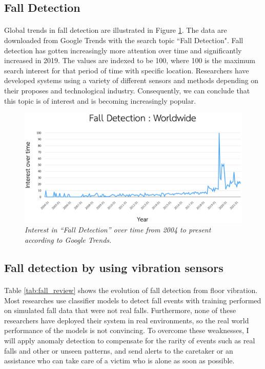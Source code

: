 \subsection{Fall Detection}
\paragraph{}
Global trends in fall detection are illustrated in Figure \ref{fig:fall_trend}. The data are downloaded from Google Trends with the search topic ``Fall Detection". Fall detection has gotten increasingly more attention over time and significantly increased in 2019. The values are indexed to be 100, where 100 is the maximum search interest for that period of time with specific location. Researchers have developed systems using a variety of different sensors and methods depending on their proposes and technological industry. Consequently, we can conclude that this topic is of interest and is becoming increasingly popular.


\begin{figure}[H]
  \centering
  \caption[Fall detection trends]{\emph{Interest in “Fall Detection” over time from 2004 to present according to Google Trends.}}\label{fig:fall_trend}
  \includegraphics[width=\textwidth]{figures/fall_trend.png}  
\end{figure}

\subsection{Fall detection by using vibration sensors}
\paragraph{}
Table \ref{tab:fall_review} shows the evolution of fall detection from floor vibration. Most researches use classifier models to detect fall events with training performed on simulated fall data that were not real falls. Furthermore, none of these researchers have deployed their system in real environments, so the real world performance of the models is not convincing. To overcome these weaknesses, I will apply anomaly detection to compensate for the rarity of events such as real falls and other or unseen patterns, and send alerts to the caretaker or an assistance who can take care of a victim who is alone as soon as possible.

